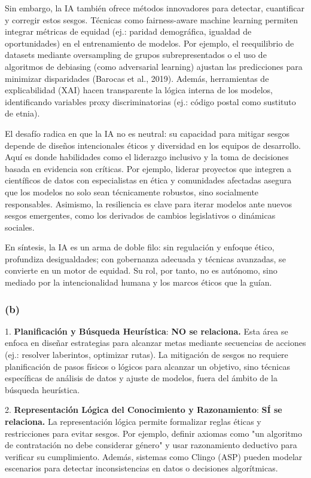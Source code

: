 \documentclass[12pt]{article}
\begin{document}
Sin embargo, la IA también ofrece métodos innovadores para detectar, cuantificar y corregir estos sesgos. Técnicas como fairness-aware machine learning permiten integrar métricas de equidad (ej.: paridad demográfica, igualdad de oportunidades) en el entrenamiento de modelos. Por ejemplo, el reequilibrio de datasets mediante oversampling de grupos subrepresentados o el uso de algoritmos de debiasing (como adversarial learning) ajustan las predicciones para minimizar disparidades (Barocas et al., 2019). Además, herramientas de explicabilidad (XAI) hacen transparente la lógica interna de los modelos, identificando variables proxy discriminatorias (ej.: código postal como sustituto de etnia).

El desafío radica en que la IA no es neutral: su capacidad para mitigar sesgos depende de diseños intencionales éticos y diversidad en los equipos de desarrollo. Aquí es donde habilidades como el liderazgo inclusivo y la toma de decisiones basada en evidencia son críticas. Por ejemplo, liderar proyectos que integren a científicos de datos con especialistas en ética y comunidades afectadas asegura que los modelos no solo sean técnicamente robustos, sino socialmente responsables. Asimismo, la resiliencia es clave para iterar modelos ante nuevos sesgos emergentes, como los derivados de cambios legislativos o dinámicas sociales.

En síntesis, la IA es un arma de doble filo: sin regulación y enfoque ético, profundiza desigualdades; con gobernanza adecuada y técnicas avanzadas, se convierte en un motor de equidad. Su rol, por tanto, no es autónomo, sino mediado por la intencionalidad humana y los marcos éticos que la guían.

\subsubsection*{(b)}

1. \textbf{Planificación y Búsqueda Heurística}: \textbf{NO se relaciona.} Esta área se enfoca en diseñar estrategias para alcanzar metas mediante secuencias de acciones (ej.: resolver laberintos, optimizar rutas). La mitigación de sesgos no requiere planificación de pasos físicos o lógicos para alcanzar un objetivo, sino técnicas específicas de análisis de datos y ajuste de modelos, fuera del ámbito de la búsqueda heurística.

2. \textbf{Representación Lógica del Conocimiento y Razonamiento}: \textbf{SÍ se relaciona.} La representación lógica permite formalizar reglas éticas y restricciones para evitar sesgos. Por ejemplo, definir axiomas como "un algoritmo de contratación no debe considerar género" y usar razonamiento deductivo para verificar su cumplimiento. Además, sistemas como Clingo (ASP) pueden modelar escenarios para detectar inconsistencias en datos o decisiones algorítmicas.
\end{document}
